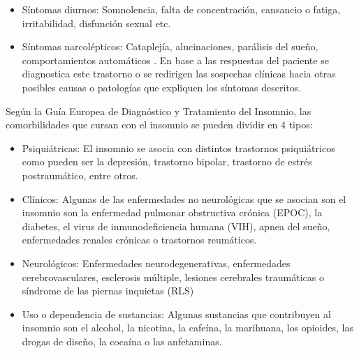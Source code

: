 \documentclass[a4paper,12pt,twoside]{memoir}
\begin{document}
\begin{itemize}
\begin{itemize}
        \item Síntomas diurnos: Somnolencia, falta de concentración, cansancio o fatiga, irritabilidad, disfunción sexual etc.
        \item Síntomas narcolépticos: Cataplejía, alucinaciones, parálisis del sueño, comportamientos automáticos \cite{ferre2020}.
    En base a las respuestas del paciente se diagnostica este trastorno o se redirigen las sospechas clínicas hacia otras posibles causas o patologías que expliquen los síntomas descritos.
    \end{itemize}
Según la Guía Europea de Diagnóstico y Tratamiento del Insomnio, las comorbilidades que cursan con el insomnio se pueden dividir en 4 tipos:
\begin{itemize}
    \item Psiquiátricas: El insomnio se asocia con distintos trastornos psiquiátricos como pueden ser la depresión, trastorno bipolar, trastorno de estrés postraumático, entre otros.
    \item Clínicos: Algunas de las enfermedades no neurológicas que se asocian son el insomnio son la enfermedad pulmonar obstructiva crónica (EPOC), la diabetes, el virus de inmunodeficiencia humana (VIH), apnea del sueño, enfermedades renales crónicas o trastornos reumáticos.
    \item Neurológicos: Enfermedades neurodegenerativas, enfermedades cerebrovasculares, esclerosis múltiple, lesiones cerebrales traumáticas o síndrome de las piernas inquietas (RLS)
    \item Uso o dependencia de sustancias: Algunas sustancias que contribuyen al insomnio son el alcohol, la nicotina, la cafeína, la marihuana, los opioides, las drogas de diseño, la cocaína o las anfetaminas. 
\end{itemize}

\end{itemize}
\end{document}
